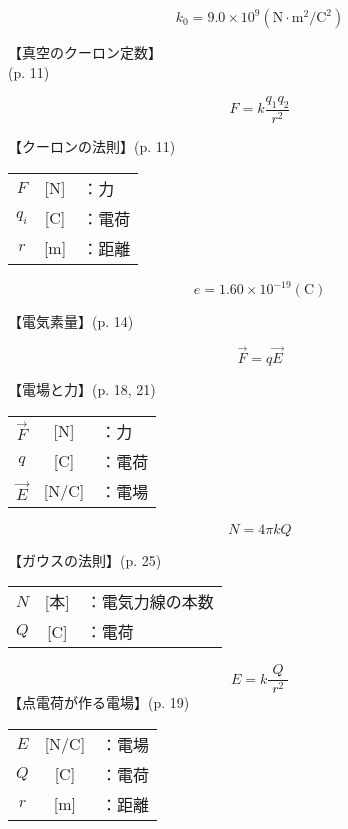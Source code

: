 \documentclass[10pt]{jarticle}
\begin{document}
\newpage
\[
	k_0 = 9.0 \! \times \! 10^9  \mathrm{(N \! \cdot \! m^2/C^2)}
\]


\vskip3mm
【真空のクーロン定数】\\
\hfill {\footnotesize (p. 11)}





\newpage
\[
F = k \frac{q_1 q_2}{r^2}
\]


\vskip3mm
【クーロンの法則】{\footnotesize (p. 11)}

\begin{tabular}{ccl}
$F$	&[N]	&：力 \\
$q_i$	&[C]	&：電荷 \\
$r$	&[m]	&：距離
\end{tabular}




\newpage
\[
e = 1.60 \! \times \! 10^{-19} \mathrm{(C)}
\]


\vskip3mm
【電気素量】{\footnotesize (p. 14)}




\newpage
\[
\vec{F} = q \vec{E}
\]


\vskip3mm
【電場と力】{\footnotesize (p. 18, 21)}

\begin{tabular}{ccl}
$\vec{F}$	&[N]	&：力 \\
$q$	&[C]	&：電荷 \\
$\vec{E}$	&[N/C]	&：電場
\end{tabular}





\newpage
\[
N = 4\pi k Q
\]


\vskip3mm
【ガウスの法則】{\footnotesize (p. 25)}

\begin{tabular}{ccl}
$N$	&[本]	&：電気力線の本数 \\
$Q$	&[C]	&：電荷
\end{tabular}




\newpage
\[
E = k \frac{Q}{\; r^2 \;}
\]
\vskip3mm
【点電荷が作る電場】{\footnotesize (p. 19)}

\begin{tabular}{ccl}
$E$	&[N/C]	&：電場 \\
$Q$	&[C]	&：電荷 \\
$r$	&[m]	&：距離
\end{tabular}
\end{document}
